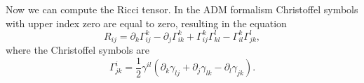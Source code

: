 \documentclass[12pt]{article}
\numberwithin{equation}{section}
\begin{document}

Now we can compute the Ricci tensor.  In the ADM formalism Christoffel symbols with upper index zero are equal to zero, resulting in the equation
\begin{equation}
R_{ij} = \partial_k \Gamma^k_{ij} - \partial_j \Gamma^k_{ik} + \Gamma^k_{ij} \Gamma^l_{kl} - \Gamma^k_{il} \Gamma^l_{jk},
\end{equation}
where the Christoffel symbols are
\begin{equation}
\Gamma^i_{jk} = \frac{1}{2} \gamma^{il} (\partial_k \gamma_{lj} + \partial_j \gamma_{lk} - \partial_l \gamma_{jk}).
\end{equation}
\end{document}
